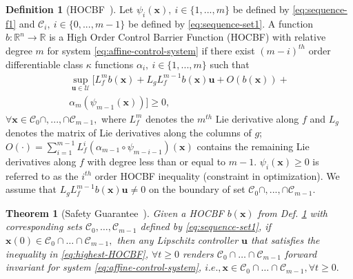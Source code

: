 \documentclass[letterpaper, 10 pt, conference]{ieeeconf}
\newtheorem{theorem}{Theorem}
\theoremstyle{definition}
\newtheorem{definition}{Definition}
\begin{document}
\begin{definition}[HOCBF~\cite{xiao2021high}]
\label{def:HOCBF}
Let $\psi_{i}(\boldsymbol{x}),\ i\in \{1,...,m\}$ be defined by \eqref{eq:sequence-f1} and $\mathcal C_{i},\ i\in \{0,...,m-1\}$ be defined by \eqref{eq:sequence-set1}. A function $b:\mathbb{R}^{n}\to\mathbb{R}$ is a High Order Control Barrier Function (HOCBF) with relative degree $m$ for system \eqref{eq:affine-control-system} if there exist $(m-i)^{th}$ order differentiable class $\kappa$ functions $\alpha_{i},\ i\in \{1,...,m\}$ such that
\begin{equation}
\label{eq:highest-HOCBF}
\begin{split}
\sup_{\boldsymbol{u}\in \mathcal U}[L_{f}^{m}b(\boldsymbol{x})+L_{g}L_{f}^{m-1}b(\boldsymbol{x})\boldsymbol{u}+O(b(\boldsymbol{x}))
+\\
\alpha_{m}(\psi_{m-1}(\boldsymbol{x}))]\ge 0,
\end{split}
\end{equation}
$\forall \boldsymbol{x}\in \mathcal C_{0}\cap,...,\cap \mathcal C_{m-1},$ where $L_{f}^{m}$ denotes the $m^{th}$ Lie derivative along $f$ and $L_{g}$ denotes the matrix of Lie derivatives along the columns of $g$; 
$O(\cdot)=\sum_{i=1}^{m-1}L_{f}^{i}(\alpha_{m-1}\circ\psi_{m-i-1})(\boldsymbol{x})$ contains the remaining Lie derivatives along $f$ with degree less than or equal to $m-1$. $\psi_{i}(\boldsymbol{x})\ge0$ is referred to as the $i^{th}$ order HOCBF inequality (constraint in optimization). We assume that $L_{g}L_{f}^{m-1}b(\boldsymbol{x})\boldsymbol{u}\ne0$ on the boundary of set $\mathcal C_{0}\cap,...,\cap \mathcal C_{m-1}.$ 
\end{definition}

\begin{theorem}[Safety Guarantee~\cite{xiao2021high}]
\label{thm:safety-guarantee}
Given a HOCBF $b(\boldsymbol{x})$ from Def. \ref{def:HOCBF} with corresponding sets $\mathcal{C}_{0}, \dots,\mathcal {C}_{m-1}$ defined by \eqref{eq:sequence-set1}, if $\boldsymbol{x}(0) \in \mathcal {C}_{0}\cap \dots \cap \mathcal {C}_{m-1},$ then any Lipschitz controller $\boldsymbol{u}$ that satisfies the inequality in \eqref{eq:highest-HOCBF}, $\forall t\ge 0$ renders $\mathcal {C}_{0}\cap \dots \cap \mathcal {C}_{m-1}$ forward invariant for system \eqref{eq:affine-control-system}, $i.e., \boldsymbol{x} \in \mathcal {C}_{0}\cap \dots \cap \mathcal {C}_{m-1}, \forall t\ge 0.$
\end{theorem}
\end{document}
